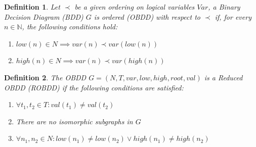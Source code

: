 \documentclass[pdflatex,sn-mathphys-num]{sn-jnl}%
\theoremstyle{thmstyleone}%
\theoremstyle{thmstyletwo}%
\theoremstyle{thmstylethree}%
\newtheorem{definition}{Definition}%
\begin{document}
        \vspace*{0.5em}

        \begin{definition}
            Let $\prec$ be a given ordering on logical variables $Var$, a Binary Decision Diagram (BDD) $G$ is ordered (OBDD) with respect to $\prec$ if, for every $n \in \mathbb{N}$, the following conditions hold:
            \begin{enumerate}[noindent]
                \item $low(n) \in N \implies var(n) \prec var(low(n))$
                \item $high(n) \in N \implies var(n) \prec var(high(n))$
            \end{enumerate}
        \end{definition}

        \begin{definition}
            The OBDD $G = (N, T, var, low, high, root, val)$ is a Reduced OBDD (ROBDD) if the following conditions are satisfied:
            \begin{enumerate}[noindent]
                \item $\forall t_1, t_2 \in T : val(t_1) \neq val(t_2)$
                \item There are no isomorphic subgraphs in $G$
                \item $\forall n_1, n_2 \in N : low(n_1) \neq low(n_2) \lor high(n_1) \neq high(n_2)$
            \end{enumerate}
        \end{definition}
\end{document}
